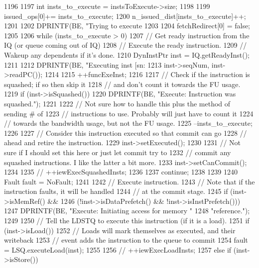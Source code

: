 \begin{DoxyCode}
1196 {
1197     int insts_to_execute = instsToExecute->size;
1198 
1199     issued_ops[0]+= insts_to_execute;
1200     n_issued_dist[insts_to_execute]++;
1201 
1202     DPRINTF(BE, "Trying to execute %
1203 
1204     fetchRedirect[0] = false;
1205 
1206     while (insts_to_execute > 0) {
1207         // Get ready instruction from the IQ (or queue coming out of IQ)
1208         // Execute the ready instruction.
1209         // Wakeup any dependents if it's done.
1210         DynInstPtr inst = IQ.getReadyInst();
1211 
1212         DPRINTF(BE, "Executing inst [sn:%
1213                 inst->seqNum, inst->readPC());
1214 
1215         ++funcExeInst;
1216 
1217         // Check if the instruction is squashed; if so then skip it
1218         // and don't count it towards the FU usage.
1219         if (inst->isSquashed()) {
1220             DPRINTF(BE, "Execute: Instruction was squashed.\n");
1221 
1222             // Not sure how to handle this plus the method of sending # of
1223             // instructions to use.  Probably will just have to count it
1224             // towards the bandwidth usage, but not the FU usage.
1225             --insts_to_execute;
1226 
1227             // Consider this instruction executed so that commit can go
1228             // ahead and retire the instruction.
1229             inst->setExecuted();
1230 
1231             // Not sure if I should set this here or just let commit try to
1232             // commit any squashed instructions.  I like the latter a bit more.
1233             inst->setCanCommit();
1234 
1235 //            ++iewExecSquashedInsts;
1236 
1237             continue;
1238         }
1239 
1240         Fault fault = NoFault;
1241 
1242         // Execute instruction.
1243         // Note that if the instruction faults, it will be handled
1244         // at the commit stage.
1245         if (inst->isMemRef() &&
1246             (!inst->isDataPrefetch() && !inst->isInstPrefetch())) {
1247             DPRINTF(BE, "Execute: Initiating access for memory "
1248                     "reference.\n");
1249 
1250             // Tell the LDSTQ to execute this instruction (if it is a load).
1251             if (inst->isLoad()) {
1252                 // Loads will mark themselves as executed, and their writeback
1253                 // event adds the instruction to the queue to commit
1254                 fault = LSQ.executeLoad(inst);
1255 
1256 //                ++iewExecLoadInsts;
1257             } else if (inst->isStore()) {
}}}}
\end{DoxyCode}
